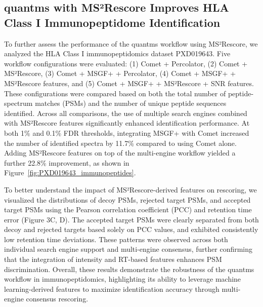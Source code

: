 \documentclass[12pt]{article}
\begin{document}
\subsection{quantms with MS²Rescore Improves HLA Class I Immunopeptidome Identification}
To further assess the performance of the quantms workflow using MS²Rescore, we analyzed the HLA Class I immunopeptidomics dataset PXD019643. Five workflow configurations were evaluated: (1) Comet + Percolator, (2) Comet + MS²Rescore, (3) Comet + MSGF+ + Percolator, (4) Comet + MSGF+ + MS²Rescore features, and (5) Comet + MSGF+ + MS²Rescore + SNR features. These configurations were compared based on both the total number of peptide-spectrum matches (PSMs) and the number of unique peptide sequences identified. Across all comparisons, the use of multiple search engines combined with MS²Rescore features significantly enhanced identification performance. At both 1\% and 0.1\% FDR thresholds, integrating MSGF+ with Comet increased the number of identified spectra by 11.7\% compared to using Comet alone. Adding MS²Rescore features on top of the multi-engine workflow yielded a further 22.8\% improvement, as shown in Figure~\ref{fig:PXD019643_immunopeptides}.

To better understand the impact of MS²Rescore-derived features on rescoring, we visualized the distributions of decoy PSMs, rejected target PSMs, and accepted target PSMs using the Pearson correlation coefficient (PCC) and retention time error (Figure 3C, D). The accepted target PSMs were clearly separated from both decoy and rejected targets based solely on PCC values, and exhibited consistently low retention time deviations. These patterns were observed across both individual search engine support and multi-engine consensus, further confirming that the integration of intensity and RT-based features enhances PSM discrimination. Overall, these results demonstrate the robustness of the quantms workflow in immunopeptidomics, highlighting its ability to leverage machine learning-derived features to maximize identification accuracy through multi-engine consensus rescoring.
\end{document}
